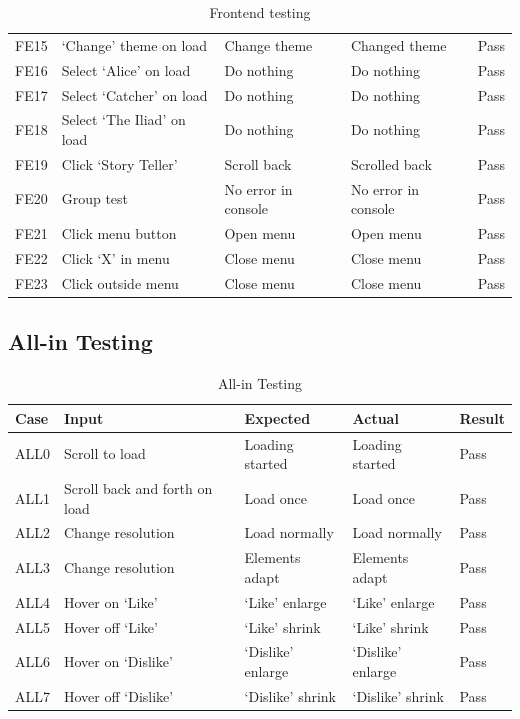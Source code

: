 \documentclass[12pt]{report}
\begin{document}
\begin{appendices}
\begin{table}[ht]
\begin{tabular}{lllll}
  FE15 & `Change' theme on load & Change theme & Changed theme & Pass\\
  \addlinespace[3pt]
  FE16 & Select `Alice' on load & Do nothing & Do nothing & Pass\\
  \addlinespace[3pt]
  FE17 & Select `Catcher' on load & Do nothing & Do nothing & Pass\\
  \addlinespace[3pt]
  FE18 & Select `The Iliad' on load & Do nothing & Do nothing & Pass\\
  \addlinespace[3pt]
  FE19 & Click `Story Teller' & Scroll back & Scrolled back & Pass\\
  \addlinespace[3pt]
  FE20 & Group test & No error in console & No error in console & Pass\\
  \addlinespace[3pt]
  FE21 & Click menu button & Open menu & Open menu & Pass\\
  \addlinespace[3pt]
  FE22 & Click `X' in menu & Close menu & Close menu & Pass\\
  \addlinespace[3pt]
  FE23 & Click outside menu & Close menu & Close menu & Pass\\

  \bottomrule
  \end{tabular}
  \caption{Frontend testing}
\end{table}

\clearpage

\subsection*{All-in Testing}
\label{appendix:all-in_testing}

\begin{table}[ht]
  \centering
  \begin{tabular}{@{\extracolsep{1pt}}lllll}
  \toprule   
  {Case} & {Input} & {Expected} & {Actual} & {Result}\\
  \midrule
  ALL0 & Scroll to load & Loading started & Loading started & Pass\\ 
  \addlinespace[3pt]
  ALL1 & Scroll back and forth on load & Load once & Load once & Pass\\
  \addlinespace[3pt]
  ALL2 & Change resolution & Load normally & Load normally & Pass\\
  \addlinespace[3pt]
  ALL3 & Change resolution & Elements adapt & Elements adapt & Pass\\
  \addlinespace[3pt]
  ALL4 & Hover on `Like' & `Like' enlarge & `Like' enlarge & Pass\\
  \addlinespace[3pt]
  ALL5 & Hover off `Like' & `Like' shrink & `Like' shrink & Pass\\
  \addlinespace[3pt]
  ALL6 & Hover on `Dislike' & `Dislike' enlarge & `Dislike' enlarge & Pass\\
  \addlinespace[3pt]
  ALL7 & Hover off `Dislike' & `Dislike' shrink & `Dislike' shrink & Pass\\
  \bottomrule
  \end{tabular}
  \caption{All-in Testing}
\end{table}


\end{appendices}
\end{document}
